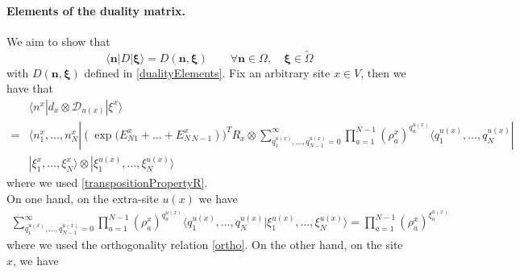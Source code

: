 \documentclass[10pt]{article}
\numberwithin{equation}{section}
\numberwithin{equation}{subsection}
\newcommand{\dd}{\mathcal{D}_{u(x)}}
\begin{document}
\paragraph{Elements of the duality matrix.}We aim to show that 
\begin{equation}\label{proofDualityElements}
\langle \bm{n}|D|\bm{\xi}\rangle=D(\bm{n},\bm{\xi})\qquad   \forall \bm{n}\in \Omega,\quad \bm{\xi}\in \widetilde{\Omega}
\end{equation}
with $D(\bm{n},\bm{\xi})$ defined in \eqref{dualityElements}. 
Fix an arbitrary site $x\in V$, then we have that 
\begin{align*}
	 &\langle n^{x}|d_{x}\otimes \dd|\xi^{x}\rangle\\=&\langle n_{1}^{x},\ldots,n_{N}^{x}| (\exp{(E_{N1}^{x}+\ldots+E_{N\,N-1}^{x}}))^{T}R_{x}\otimes\sum_{q_{1}^{u(x)},\ldots,q_{N-1}^{u(x)}=0}^{\infty}\prod_{a=1}^{N-1}\left(\rho_{a}^{x}\right)^{q_{a}^{u(x)}}\langle q_{1}^{u(x)},\ldots,q_{N}^{u(x)}|
	 \\&|\xi_{1}^{x},\ldots,\xi_{N}^{x}\rangle \otimes |\xi_{1}^{u(x)},\ldots,\xi_{N}^{u(x)}\rangle
\end{align*}
where we used \eqref{transpositionPropertyR}. \\
On one hand, on the extra-site $u(x)$ we have 
\begin{align*}
\sum_{q_{1}^{u(x)},\ldots,q_{N-1}^{u(x)}=0}^{\infty}\prod_{a=1}^{N-1}\left(\rho_{a}^{x}\right)^{q_{a}^{u(x)}}\langle q_{1}^{u(x)},\ldots,q_{N}^{u(x)}|\xi_{1}^{u(x)},\ldots,\xi_{N}^{u(x)}\rangle=\prod_{a=1}^{N-1}\left(\rho_{a}^{x}\right)^{\xi_{a}^{u(x)}}
\end{align*}
where we used the orthogonality relation \eqref{ortho}. 
On the other hand, on the site $x$, we have 
\end{document}
